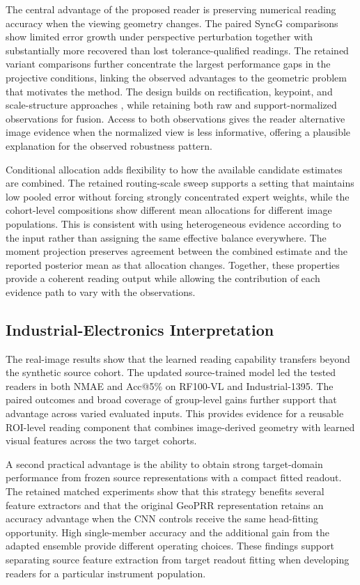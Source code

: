 \documentclass[electronics,article,submit,oneauthor]{Definitions/mdpi}
\begin{document}
The central advantage of the proposed reader is preserving numerical reading accuracy when the viewing geometry changes. The paired SyncG comparisons show limited error growth under perspective perturbation together with substantially more recovered than lost tolerance-qualified readings. The retained variant comparisons further concentrate the largest performance gaps in the projective conditions, linking the observed advantages to the geometric problem that motivates the method. The design builds on rectification, keypoint, and scale-structure approaches \cite{bao2019ipm,wang2022scalemark,tan2024transunet,lee2026p2yolo}, while retaining both raw and support-normalized observations for fusion. Access to both observations gives the reader alternative image evidence when the normalized view is less informative, offering a plausible explanation for the observed robustness pattern.

Conditional allocation adds flexibility to how the available candidate estimates are combined. The retained routing-scale sweep supports a setting that maintains low pooled error without forcing strongly concentrated expert weights, while the cohort-level compositions show different mean allocations for different image populations. This is consistent with using heterogeneous evidence according to the input rather than assigning the same effective balance everywhere. The moment projection preserves agreement between the combined estimate and the reported posterior mean as that allocation changes. Together, these properties provide a coherent reading output while allowing the contribution of each evidence path to vary with the observations.

\subsection{Industrial-Electronics Interpretation}

The real-image results show that the learned reading capability transfers beyond the synthetic source cohort. The updated source-trained model led the tested readers in both NMAE and Acc@5\% on RF100-VL and Industrial-1395. The paired outcomes and broad coverage of group-level gains further support that advantage across varied evaluated inputs. This provides evidence for a reusable ROI-level reading component that combines image-derived geometry with learned visual features across the two target cohorts.

A second practical advantage is the ability to obtain strong target-domain performance from frozen source representations with a compact fitted readout. The retained matched experiments show that this strategy benefits several feature extractors and that the original GeoPRR representation retains an accuracy advantage when the CNN controls receive the same head-fitting opportunity. High single-member accuracy and the additional gain from the adapted ensemble provide different operating choices. These findings support separating source feature extraction from target readout fitting when developing readers for a particular instrument population.
\end{document}
